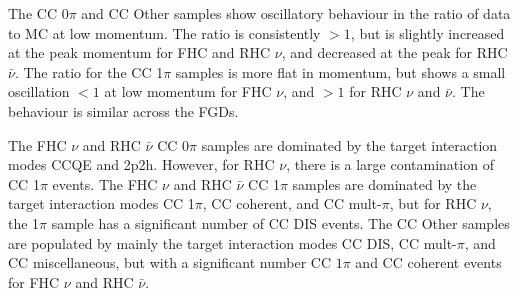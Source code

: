 The CC 0$\pi$ and CC Other samples show oscillatory behaviour in the ratio of data to MC at low momentum. The ratio is consistently $>1$, but is slightly increased at the peak momentum for FHC and RHC $\nu$, and decreased at the peak for RHC $\bar{\nu}$. The ratio for the CC 1$\pi$ samples is more flat in momentum, but shows a small oscillation $<1$ at low momentum for FHC $\nu$, and $>1$ for RHC $\nu$ and $\bar{\nu}$. The behaviour is similar across the FGDs.

The FHC $\nu$ and RHC $\bar{\nu}$ CC 0$\pi$ samples are dominated by the target interaction modes CCQE and 2p2h. However, for RHC $\nu$, there is a large contamination of CC 1$\pi$ events. The FHC $\nu$ and RHC $\bar{\nu}$ CC 1$\pi$ samples are dominated by the target interaction modes CC 1$\pi$, CC coherent, and CC mult-$\pi$, but for RHC $\nu$, the 1$\pi$ sample has a significant number of CC DIS events. The CC Other samples are populated by mainly the target interaction modes CC DIS, CC mult-$\pi$, and CC miscellaneous, but with a significant number CC $1\pi$ and CC coherent events for FHC $\nu$ and RHC $\bar{\nu}$.


